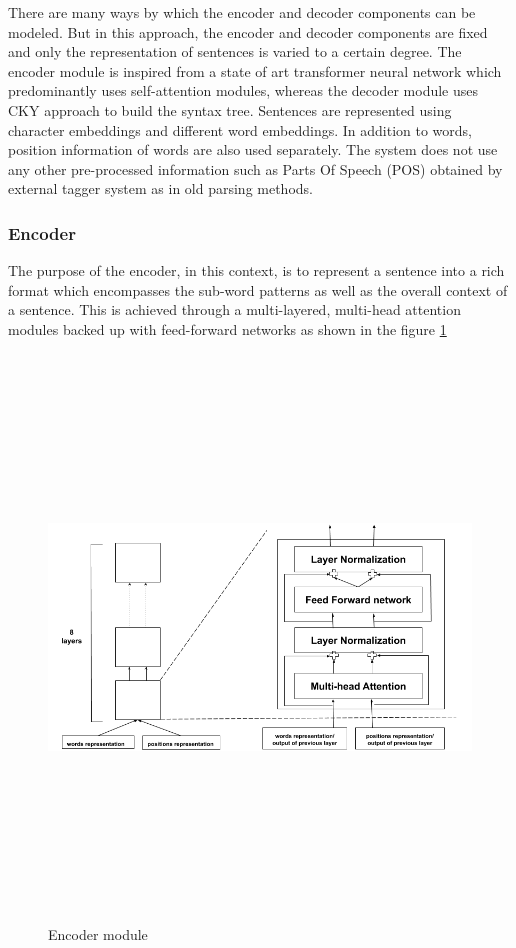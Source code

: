 \documentclass[a4paper, 11pt]{article}
\begin{document}
There are many ways by which the encoder and decoder components can be modeled. But in this approach, the encoder and decoder components are fixed and only the representation of sentences is varied to a certain degree. The encoder module is inspired from a state of art transformer neural network which predominantly uses self-attention modules, whereas the decoder module uses CKY approach to build the syntax tree. Sentences are represented using character embeddings and different word embeddings. In addition to words, position information of words are also used separately. The system does not use any other pre-processed information such as Parts Of Speech (POS) obtained by external tagger system as in old parsing methods.

\subsubsection{Encoder}

The purpose of the encoder, in this context, is to represent a sentence into a rich format which encompasses the sub-word patterns as well as the overall context of a sentence. This is achieved through a multi-layered, multi-head attention modules backed up with feed-forward networks as shown in the figure \ref{fig:encoder_module}

\begin{figure}[htpb]
    \centering
    \includegraphics[width=\textwidth,height=15cm,keepaspectratio=true]
    {encoder.png}
    \caption{
        Encoder module
    }
    \label{fig:encoder_module}
\end{figure}
\end{document}
